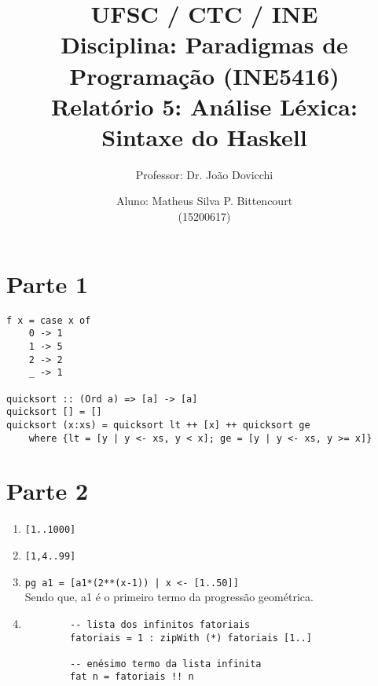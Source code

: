 \documentclass[a4paper,twocolumn,10pt]{article}
\begin{document}
\title{
	\large \rm UFSC / CTC / INE\\
	\large \rm Disciplina: Paradigmas de Programação (INE5416)\\
	\Large \bf Relatório 5: Análise Léxica: Sintaxe do Haskell
}

\author{
	Professor: Dr. João Dovicchi\\
	\and
	Aluno: Matheus Silva P. Bittencourt\\(15200617)
}

\maketitle

\thispagestyle{empty} %

\section*{Parte 1}

\begin{verbatim}
f x = case x of
    0 -> 1
    1 -> 5
    2 -> 2
    _ -> 1

quicksort :: (Ord a) => [a] -> [a]
quicksort [] = []
quicksort (x:xs) = quicksort lt ++ [x] ++ quicksort ge
    where {lt = [y | y <- xs, y < x]; ge = [y | y <- xs, y >= x]}
\end{verbatim}

\section*{Parte 2}

\begin{enumerate}
	\item \verb$[1..1000]$
	\item \verb$[1,4..99]$
	\item \verb$pg a1 = [a1*(2**(x-1)) | x <- [1..50]]$\\
		Sendo que, a1 é o primeiro termo da progressão geométrica.
	\item
		\begin{verbatim}
		-- lista dos infinitos fatoriais
		fatoriais = 1 : zipWith (*) fatoriais [1..]

		-- enésimo termo da lista infinita
		fat n = fatoriais !! n
		\end{verbatim}
\end{enumerate}
\end{document}
